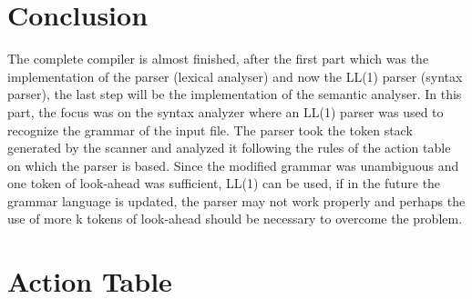 \documentclass{article}
\begin{document}
\section{Conclusion}
The complete compiler is almost finished, after the first part which was the implementation of the parser (lexical analyser) and now the LL(1) parser (syntax parser), the last step will be the implementation of the semantic analyser. In this part, the focus was on the syntax analyzer where an LL(1) parser was used to recognize the grammar of the input file. The parser took the token stack generated by the scanner and analyzed it following the rules of the action table on which the parser is based. Since the modified grammar was unambiguous and one token of look-ahead was sufficient, LL(1) can be used, if in the future the grammar language is updated, the parser may not work properly and perhaps the use of more k tokens of look-ahead should be necessary to overcome the problem.


\eject \pdfpagewidth=17.4in \pdfpageheight=7in

\appendix
\section{Action Table}
\label{appendix:action_table}
\end{document}
